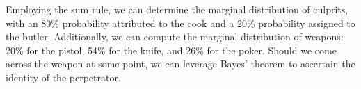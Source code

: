 \begin{example}
    Employing the sum rule, we can determine the marginal distribution of culprits, with an 80$\%$ probability attributed to the cook and a 20$\%$ probability assigned to the butler. 
    Additionally, we can compute the marginal distribution of weapons: 20$\%$ for the pistol, 54$\%$ for the knife, and 26$\%$ for the poker.
    Should we come across the weapon at some point, we can leverage Bayes' theorem to ascertain the identity of the perpetrator.
\end{example}